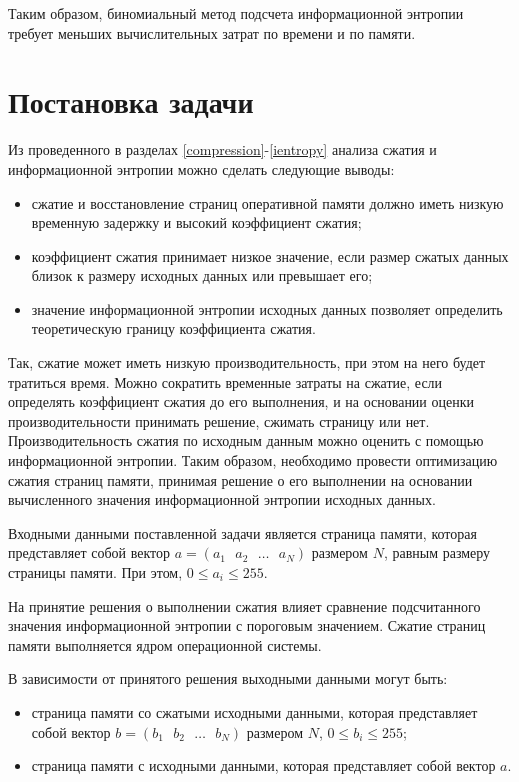 Таким образом, биномиальный метод подсчета информационной энтропии требует меньших вычислительных затрат по времени и по памяти.

\section{Постановка задачи}

Из проведенного в разделах \ref{compression}-\ref{ientropy} анализа сжатия и информационной энтропии можно сделать следующие выводы:

\begin{itemize}
	\item сжатие и восстановление страниц оперативной памяти должно иметь низкую временную задержку и высокий коэффициент сжатия;
    \item коэффициент сжатия принимает низкое значение, если размер сжатых данных близок к размеру исходных данных или превышает его;
	\item значение информационной энтропии исходных данных позволяет определить теоретическую границу коэффициента сжатия.
\end{itemize}

Так, сжатие может иметь низкую производительность, при этом на него будет тратиться время. Можно сократить временные затраты на сжатие, если определять коэффициент сжатия до его выполнения, и на основании оценки производительности принимать решение, сжимать страницу или нет. Производительность сжатия по исходным данным можно оценить с помощью информационной энтропии. Таким образом, необходимо провести оптимизацию сжатия страниц памяти, принимая решение о его выполнении на основании вычисленного значения информационной энтропии исходных данных.

Входными данными поставленной задачи является страница памяти, которая представляет собой вектор $a = (a_1\text{ }a_2\text{ }\dotso\text{ }a_N)$ размером $N$, равным размеру страницы памяти. При этом, $0 \leq a_i \leq 255$.

На принятие решения о выполнении сжатия влияет сравнение подсчитанного значения информационной энтропии с пороговым значением. Сжатие страниц памяти выполняется ядром операционной системы.

В зависимости от принятого решения выходными данными могут быть:
\begin{itemize}
	\item страница памяти со сжатыми исходными данными, которая представляет собой вектор $b = (b_1\text{ }b_2\text{ }\dotso\text{ }b_N)$ размером $N$, $0 \leq b_i \leq 255$;
    \item страница памяти с исходными данными, которая представляет собой вектор $a$.
\end{itemize}

